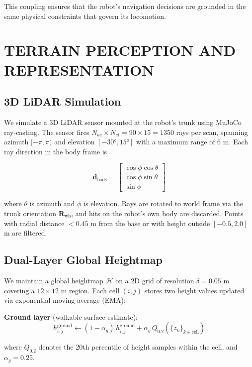 \documentclass[11pt,a4paper]{article}
\begin{document}
This coupling ensures that the robot's navigation decisions are grounded in the same physical constraints that govern its locomotion.

\section{TERRAIN PERCEPTION AND REPRESENTATION}

\subsection{3D LiDAR Simulation}

We simulate a 3D LiDAR sensor mounted at the robot's trunk using MuJoCo ray-casting. The sensor fires $N_{az} \times N_{el} = 90 \times 15 = 1350$ rays per scan, spanning azimuth $[-\pi, \pi)$ and elevation $[-30°, 15°]$ with a maximum range of 6 m. Each ray direction in the body frame is

\begin{equation}
\mathbf{d}_{\text{body}} = \begin{bmatrix} \cos\phi\cos\theta \\ \cos\phi\sin\theta \\ \sin\phi \end{bmatrix}
\end{equation}

where $\theta$ is azimuth and $\phi$ is elevation. Rays are rotated to world frame via the trunk orientation $\mathbf{R}_{\text{wb}}$, and hits on the robot's own body are discarded. Points with radial distance $< 0.45$ m from the base or with height outside $[-0.5, 2.0]$ m are filtered.

\subsection{Dual-Layer Global Heightmap}

We maintain a global heightmap $\mathcal{H}$ on a 2D grid of resolution $\delta = 0.05$ m covering a $12 \times 12$ m region. Each cell $(i,j)$ stores two height values updated via exponential moving average (EMA):

\textbf{Ground layer} (walkable surface estimate):
\begin{equation}
h^{\text{ground}}_{i,j} \leftarrow (1 - \alpha_g)\, h^{\text{ground}}_{i,j} + \alpha_g\, Q_{0.2}(\{z_k\}_{k \in \text{cell}})
\end{equation}

where $Q_{0.2}$ denotes the 20th percentile of height samples within the cell, and $\alpha_g = 0.25$.
\end{document}

